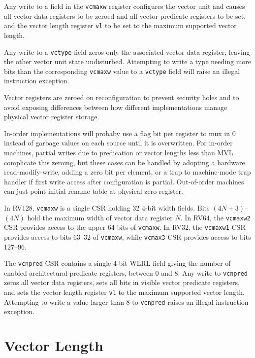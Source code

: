 Any write to a field in the {\tt vcmaxw} register configures the
vector unit and causes all vector data registers to be zeroed and all
vector predicate registers to be set, and the vector length register
{\tt vl} to be set to the maximum supported vector length.

Any write to a {\tt vctype} field zeros only the associated vector
data register, leaving the other vector unit state undisturbed.
Attempting to write a type needing more bits than the corresponding
{\tt vcmaxw} value to a {\tt vctype} field will raise an illegal
instruction exception.

\begin{commentary}
  Vector registers are zeroed on reconfiguration to prevent security
  holes and to avoid exposing differences between how different
  implementations manage physical vector register storage.

  In-order implementations will probaby use a flag bit per register to
  mux in 0 instead of garbage values on each source until it is
  overwritten.  For in-order machines, partial writes due to
  predication or vector lengths less than MVL complicate this zeroing,
  but these cases can be handled by adopting a hardware
  read-modify-write, adding a zero bit per element, or a trap to
  machine-mode trap handler if first write access after configuration
  is partial.  Out-of-order machines can just point initial rename
  table at physical zero register.
\end{commentary}


In RV128, {\tt vcmaxw} is a single CSR holding 32 4-bit width
fields.  Bits $(4N+3)$--$(4N)$ hold the maximum width of vector data
register $N$.  In RV64, the {\tt vcmaxw2} CSR provides access to the
upper 64 bits of {\tt vcmaxw}.  In RV32, the {\tt vcmaxw1} CSR
provides access to bits 63--32 of {\tt vcmaxw}, while {\tt vcmax3} CSR
provides access to bits 127--96.

The {\tt vcnpred} CSR contains a single 4-bit WLRL field giving the
number of enabled architectural predicate registers, between 0 and 8.
Any write to {\tt vcnpred} zeros all vector data registers, sets all
bits in visible vector predicate registers, and sets the vector length
register {\tt vl} to the maximum supported vector length.  Attempting
to write a value larger than 8 to {\tt vcnpred} raises an illegal
instruction exception.

\section{Vector Length}

